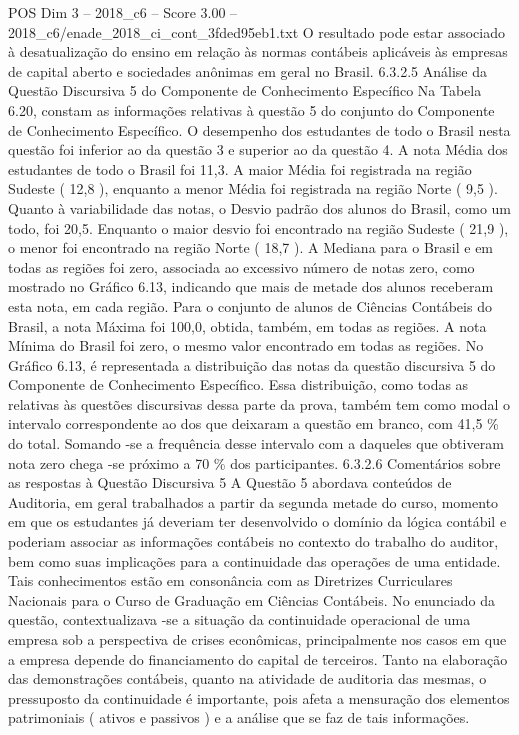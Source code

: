 \begin{textsample}{POS Dim 3 – 2018\_c6 – Score 3.00 – 2018\_c6/enade\_2018\_ci\_cont\_3fded95eb1.txt}
O resultado pode estar associado à desatualização do ensino em relação às normas contábeis aplicáveis às empresas de capital aberto e sociedades anônimas em geral no Brasil. 6.3.2.5 Análise da Questão Discursiva 5 do Componente de Conhecimento Específico Na Tabela 6.20, constam as informações relativas à questão 5 do conjunto do Componente de Conhecimento Específico.
O desempenho dos estudantes de todo o Brasil nesta questão foi inferior ao da questão 3 e superior ao da questão 4.
A nota Média dos estudantes de todo o Brasil foi 11,3.
A maior Média foi registrada na região Sudeste ( 12,8 ), enquanto a menor Média foi registrada na região Norte ( 9,5 ).
Quanto à variabilidade das notas, o Desvio padrão dos alunos do Brasil, como um todo, foi 20,5.
Enquanto o maior desvio foi encontrado na região Sudeste ( 21,9 ), o menor foi encontrado na região Norte ( 18,7 ).
A Mediana para o Brasil e em todas as regiões foi zero, associada ao excessivo número de notas zero, como mostrado no Gráfico 6.13, indicando que mais de metade dos alunos receberam esta nota, em cada região.
Para o conjunto de alunos de Ciências Contábeis do Brasil, a nota Máxima foi 100,0, obtida, também, em todas as regiões.
A nota Mínima do Brasil foi zero, o mesmo valor encontrado em todas as regiões.
No Gráfico 6.13, é representada a distribuição das notas da questão discursiva 5 do Componente de Conhecimento Específico.
Essa distribuição, como todas as relativas às questões discursivas dessa parte da prova, também tem como modal o intervalo correspondente ao dos que deixaram a questão em branco, com 41,5 \% do total.
Somando -se a frequência desse intervalo com a daqueles que obtiveram nota zero chega -se próximo a 70 \% dos participantes. 6.3.2.6 Comentários sobre as respostas à Questão Discursiva 5 A Questão 5 abordava conteúdos de Auditoria, em geral trabalhados a partir da segunda metade do curso, momento em que os estudantes já deveriam ter desenvolvido o domínio da lógica contábil e poderiam associar as informações contábeis no contexto do trabalho do auditor, bem como suas implicações para a continuidade das operações de uma entidade.
Tais conhecimentos estão em consonância com as Diretrizes Curriculares Nacionais para o Curso de Graduação em Ciências Contábeis.
No enunciado da questão, contextualizava -se a situação da continuidade operacional de uma empresa sob a perspectiva de crises econômicas, principalmente nos casos em que a empresa depende do financiamento do capital de terceiros.
Tanto na elaboração das demonstrações contábeis, quanto na atividade de auditoria das mesmas, o pressuposto da continuidade é importante, pois afeta a mensuração dos elementos patrimoniais ( ativos e passivos ) e a análise que se faz de tais informações.

\end{textsample}
